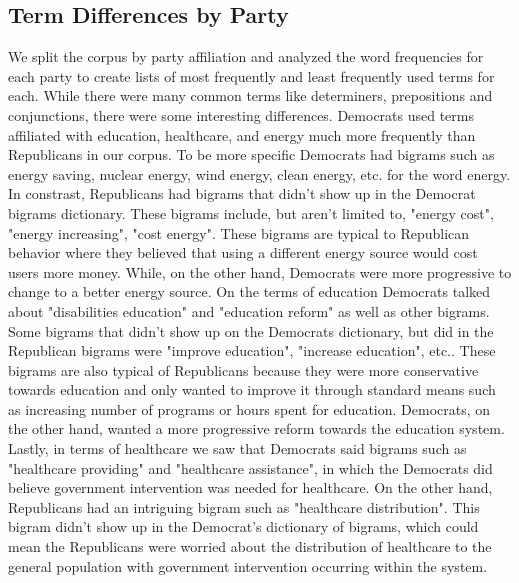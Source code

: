 \documentclass[a4paper, 12pt]{article}
\begin{document}
\subsection{Term Differences by Party}
We split the corpus by party affiliation and analyzed the word frequencies for each party to create lists of most frequently and least frequently used terms for each. While there were many common terms like determiners, prepositions and conjunctions, there were some interesting differences. Democrats used terms affiliated with education, healthcare, and energy much more frequently than Republicans in our corpus. 
To be more specific Democrats had bigrams such as energy saving, nuclear energy, wind energy, clean energy, etc. for the word energy. In constrast, Republicans had bigrams that didn't show up in the Democrat bigrams dictionary. These bigrams include, but aren't limited to, "energy cost", "energy increasing", "cost energy". These bigrams are typical to Republican behavior where they believed that using a different energy source would cost users more money. While, on the other hand, Democrats were more progressive to change to a better energy source. On the terms of education Democrats talked about "disabilities education" and "education reform" as well as other bigrams. Some bigrams that didn't show up on the Democrats dictionary, but did in the Republican bigrams were "improve education", "increase education", etc.. These bigrams are also typical of Republicans because they were more conservative towards education and only wanted to improve it through standard means such as increasing number of programs or hours spent for education. Democrats, on the other hand, wanted a more progressive reform towards the education system. Lastly, in terms of healthcare we saw that Democrats said bigrams such as "healthcare providing" and "healthcare assistance", in which the Democrats did believe government intervention was needed for healthcare. On the other hand, Republicans had an intriguing bigram such as "healthcare distribution". This bigram didn't show up in the Democrat's dictionary of bigrams, which could mean the Republicans were worried about the distribution of healthcare to the general population with government intervention occurring within the system. 
\end{document}
